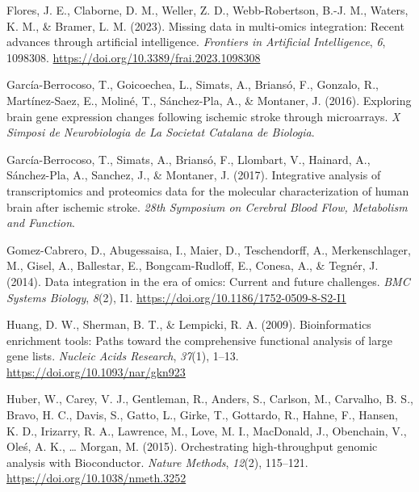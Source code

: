 \documentclass[a4paper, nobind]{templates/ociamthesis}
\newlength{\cslhangindent}
\newenvironment{CSLReferences}[2] %
 {%
  \setlength{\parindent}{0pt}
  \ifodd #1
  \let\oldpar\par
  \def\par{\hangindent=\cslhangindent\oldpar}
  \fi
  \setlength{\parskip}{1mm}
  \setlength{\baselineskip}{6mm}
 }%
 {}
\begin{document}
\begin{CSLReferences}{1}{0}
\leavevmode{}%
Flores, J. E., Claborne, D. M., Weller, Z. D., Webb-Robertson, B.-J. M., Waters, K. M., \& Bramer, L. M. (2023). Missing data in multi-omics integration: {Recent} advances through artificial intelligence. \emph{Frontiers in Artificial Intelligence}, \emph{6}, 1098308. \url{https://doi.org/10.3389/frai.2023.1098308}

\leavevmode{}%
García-Berrocoso, T., Goicoechea, L., Simats, A., Briansó, F., Gonzalo, R., Martínez-Saez, E., Moliné, T., Sánchez-Pla, A., \& Montaner, J. (2016). Exploring brain gene expression changes following ischemic stroke through microarrays. \emph{X Simposi de Neurobiologia de La Societat Catalana de Biologia}.

\leavevmode{}%
García-Berrocoso, T., Simats, A., Briansó, F., Llombart, V., Hainard, A., Sánchez-Pla, A., Sanchez, J., \& Montaner, J. (2017). Integrative analysis of transcriptomics and proteomics data for the molecular characterization of human brain after ischemic stroke. \emph{28th Symposium on Cerebral Blood Flow, Metabolism and Function}.

\leavevmode{}%
Gomez-Cabrero, D., Abugessaisa, I., Maier, D., Teschendorff, A., Merkenschlager, M., Gisel, A., Ballestar, E., Bongcam-Rudloff, E., Conesa, A., \& Tegnér, J. (2014). Data integration in the era of omics: Current and future challenges. \emph{BMC Systems Biology}, \emph{8}(2), I1. \url{https://doi.org/10.1186/1752-0509-8-S2-I1}

\leavevmode{}%
Huang, D. W., Sherman, B. T., \& Lempicki, R. A. (2009). Bioinformatics enrichment tools: Paths toward the comprehensive functional analysis of large gene lists. \emph{Nucleic Acids Research}, \emph{37}(1), 1--13. \url{https://doi.org/10.1093/nar/gkn923}

\leavevmode{}%
Huber, W., Carey, V. J., Gentleman, R., Anders, S., Carlson, M., Carvalho, B. S., Bravo, H. C., Davis, S., Gatto, L., Girke, T., Gottardo, R., Hahne, F., Hansen, K. D., Irizarry, R. A., Lawrence, M., Love, M. I., MacDonald, J., Obenchain, V., Oleś, A. K., \ldots{} Morgan, M. (2015). Orchestrating high-throughput genomic analysis with {Bioconductor}. \emph{Nature Methods}, \emph{12}(2), 115--121. \url{https://doi.org/10.1038/nmeth.3252}


\end{CSLReferences}
\end{document}

